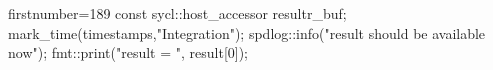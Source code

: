 \begin{cppcode*}{firstnumber=189}
        const sycl::host_accessor result{r_buf};
        mark_time(timestamps,"Integration");
        spdlog::info("result should be available now");
        fmt::print("result = {}\n", result[0]);
\end{cppcode*}
